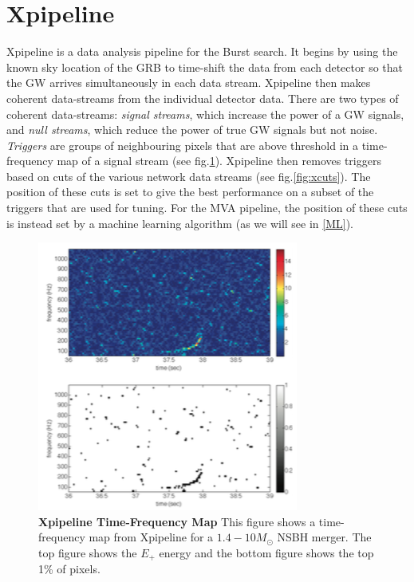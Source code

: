 \documentclass[12pt,twoside,a4paper]{report}
\begin{document}


\section{\label{xtriggers}Xpipeline}
Xpipeline is a data analysis pipeline for the Burst search. It begins by using the known sky location of the GRB to time-shift the data from each detector so that the GW arrives simultaneously in each data stream. Xpipeline then makes coherent data-streams from the individual detector data. There are two types of coherent data-streams: \textit{signal streams}, which increase the power of a GW signals, and \textit{null streams}, which reduce the power of true GW signals but not noise. \textit{Triggers} are groups of neighbouring pixels that are above threshold in a time-frequency map of a signal stream (see fig.\ref{fig:tfmap}). Xpipeline then removes triggers based on cuts of the various network data streams (see fig.\ref{fig:xcuts}). The position of these cuts is set to give the best performance on a subset of the triggers that are used for tuning. For the MVA pipeline, the position of these cuts is instead set by a machine learning algorithm (as we will see in \ref{ML}).

\begin{figure} %
\begin{center}
\includegraphics[width=0.8\linewidth]{xpipelineTFmap.png}
\end{center}
\caption{\textbf{Xpipeline Time-Frequency Map} This figure shows a time-frequency map from Xpipeline for a $1.4-10M_\odot$ NSBH merger. The top figure shows the $E_+$ energy and the bottom figure shows the top 1\% of pixels. } %
\label{fig:tfmap}
\end{figure}
\end{document}
